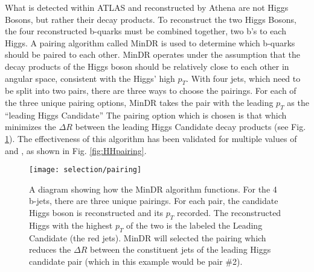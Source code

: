        What is detected within ATLAS and reconstructed by Athena are not Higgs Bosons, but rather their decay products.
        To reconstruct the two Higgs Bosons, the four reconstructed b-quarks must be combined together, two b's to each Higgs.
        A pairing algorithm called MinDR\cite{hh4b_2021_int_note}
            is used to determine which b-quarks should be paired to each other.
        MinDR operates under the assumption that the decay products of the Higgs boson
            should be relatively close to each other in angular space, consistent with the Higgs' high $p_T$.
        With four jets, which need to be split into two pairs, there are three ways to choose the pairings.
        For each of the three unique pairing options, MinDR takes the pair with the leading $p_T$ as the ``leading Higgs Candidate''
        The pairing option which is chosen is that which minimizes the $\Delta R$ between the leading Higgs Candidate decay products
            (see Fig. \ref{fig:minDR_pairing_diagram}).
        The effectiveness of this algorithm has been validated for multiple values of \kvv and \kl,
            as shown in Fig. \ref{fig:HHpairing}.

        \begin{figure}[tbh]
            \texttt{[image: selection/pairing]}
            \caption{
                A diagram showing how the MinDR algorithm functions.
                For the 4 b-jets, there are three unique pairings.
                For each pair, the candidate Higgs boson is reconstructed and its $p_T$ recorded.
                The reconstructed Higgs with the highest $p_T$ of the two is the labeled the Leading Candidate
                    (the red jets).
                MinDR will selected the pairing which reduces the $\Delta R$ between the constituent jets
                    of the leading Higgs candidate pair (which in this example would be pair \#2)\cite{hh4b_2021_int_note}.
            }
            \label{fig:minDR_pairing_diagram}
        \end{figure}

